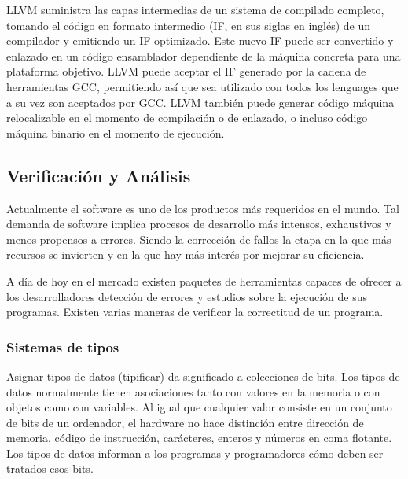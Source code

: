 LLVM suministra las capas intermedias de un sistema de compilado completo, tomando el c\'odigo en formato intermedio (IF, en sus siglas en ingl\'es) de un compilador y emitiendo un IF optimizado. Este nuevo IF puede ser convertido y enlazado en un c\'odigo ensamblador dependiente de la m\'aquina concreta para una plataforma objetivo. LLVM puede aceptar el IF generado por la cadena de herramientas GCC, permitiendo as\'i que sea utilizado con todos los lenguages que a su vez son aceptados por GCC. LLVM tambi\'en puede generar c\'odigo m\'aquina relocalizable en el momento de compilaci\'on o de enlazado, o incluso c\'odigo m\'aquina binario en el momento de ejecuci\'on.

\subsection{Verificaci\'on y An\'alisis}

Actualmente el software es uno de los productos m\'as requeridos en el mundo. Tal demanda de software implica procesos de desarrollo m\'as intensos, exhaustivos y menos propensos a errores. Siendo la correcci\'on de fallos la etapa en la que m\'as recursos se invierten y en la que hay m\'as inter\'es por mejorar su eficiencia. 

A d\'ia de hoy en el mercado existen paquetes de herramientas capaces de ofrecer a los desarrolladores detecci\'on de errores y estudios sobre la ejecuci\'on de sus programas. Existen varias maneras de verificar la correctitud de un programa.

\subsubsection*{Sistemas de tipos}

Asignar tipos de datos (tipificar) da significado a colecciones de bits. Los tipos de datos normalmente tienen asociaciones tanto con valores en la memoria o con objetos como con variables. Al igual que cualquier valor consiste en un conjunto de bits de un ordenador, el hardware no hace distinci\'on entre direcci\'on de memoria, c\'odigo de instrucci\'on, car\'acteres, enteros y n\'umeros en coma flotante. Los tipos de datos informan a los programas y programadores c\'omo deben ser tratados esos bits.

